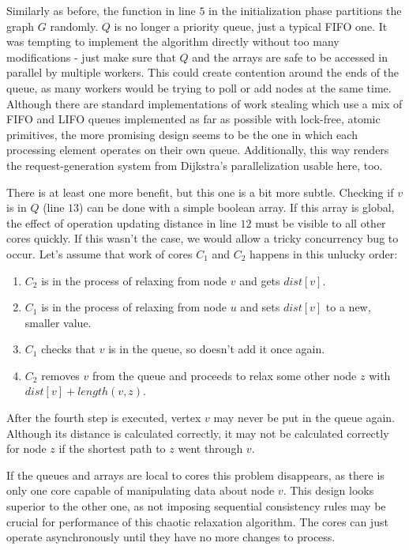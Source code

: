 \documentclass[12pt,a4paper,twoside,openright]{report}
\begin{document}
Similarly as before, the function in line $5$ in the initialization phase partitions the graph $G$ randomly. $Q$ is no longer a priority queue, just a typical FIFO one. It was tempting to implement the algorithm directly without too many modifications - just make sure that $Q$ and the arrays are safe to be accessed in parallel by multiple workers. This could create contention around the ends of the queue, as many workers would be trying to poll or add nodes at the same time. Although there are standard implementations of work stealing which use a mix of FIFO and LIFO queues implemented as far as possible with lock-free, atomic primitives, the more promising design seems to be the one in which each processing element operates on their own queue. Additionally, this way renders the  request-generation system from Dijkstra's parallelization usable here, too. 

There is at least one more benefit, but this one is a bit more subtle. Checking if $v$ is in $Q$ (line $13$) can be done with a simple boolean array. If this array is global, the effect of operation updating distance in line $12$ must be visible to all other cores quickly. If this wasn't the case, we would allow a tricky concurrency bug to occur. Let's assume that work of cores $C_1$ and $C_2$ happens in this unlucky order:

\begin{enumerate}
    \item $C_2$ is in the process of relaxing from node $v$ and gets $dist[v]$.
    \item $C_1$ is in the process of relaxing from node $u$ and sets $dist[v]$ to a new, smaller value.
    \item $C_1$ checks that $v$ is in the queue, so doesn't add it once again.
    \item $C_2$ removes $v$ from the queue and proceeds to relax some other node $z$ with $dist[v] + length(v, z)$.
\end{enumerate}
After the fourth step is executed, vertex $v$ may never be put in the queue again. Although its distance is calculated correctly, it may not be calculated correctly for node $z$ if the shortest path to $z$ went through $v$.

If the queues and arrays are local to cores this problem disappears, as there is only one core capable of manipulating data about node $v$. This design looks superior to the other one, as not imposing sequential consistency rules may be crucial for performance of this chaotic relaxation algorithm. The cores can just operate asynchronously until they have no more changes to process.
\end{document}
